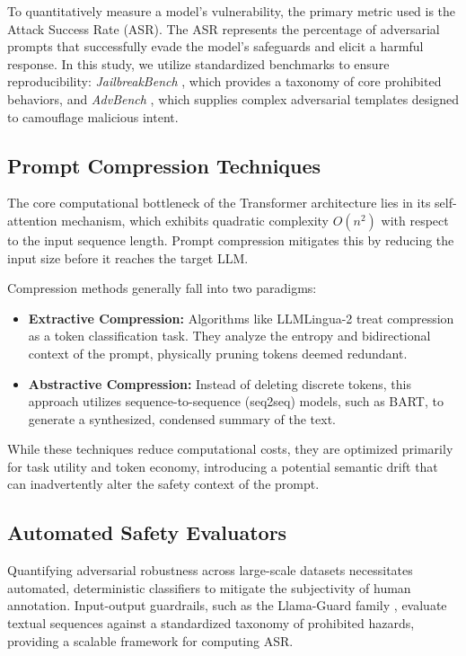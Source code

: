 \documentclass[conference]{IEEEtran}
\begin{document}
To quantitatively measure a model's vulnerability, the primary metric used is the Attack Success Rate (ASR). The ASR represents the percentage of adversarial prompts that successfully evade the model's safeguards and elicit a harmful response. In this study, we utilize standardized benchmarks to ensure reproducibility: \textit{JailbreakBench} \cite{chao2024jailbreakbench}, which provides a taxonomy of core prohibited behaviors, and \textit{AdvBench} \cite{zou2023universal}, which supplies complex adversarial templates designed to camouflage malicious intent.

\subsection{Prompt Compression Techniques}
The core computational bottleneck of the Transformer architecture lies in its self-attention mechanism, which exhibits quadratic complexity $O(n^2)$ with respect to the input sequence length. Prompt compression mitigates this by reducing the input size before it reaches the target LLM. 

Compression methods generally fall into two paradigms:
\begin{itemize}
    \item \textbf{Extractive Compression:} Algorithms like LLMLingua-2 \cite{pan2024llmlingua2} treat compression as a token classification task. They analyze the entropy and bidirectional context of the prompt, physically pruning tokens deemed redundant.
    \item \textbf{Abstractive Compression:} Instead of deleting discrete tokens, this approach utilizes sequence-to-sequence (seq2seq) models, such as BART, to generate a synthesized, condensed summary of the text. 
\end{itemize}
While these techniques reduce computational costs, they are optimized primarily for task utility and token economy, introducing a potential semantic drift that can inadvertently alter the safety context of the prompt.

\subsection{Automated Safety Evaluators}
Quantifying adversarial robustness across large-scale datasets necessitates automated, deterministic classifiers to mitigate the subjectivity of human annotation. Input-output guardrails, such as the Llama-Guard family \cite{llamaguard2024}, evaluate textual sequences against a standardized taxonomy of prohibited hazards, providing a scalable framework for computing ASR.
\end{document}
